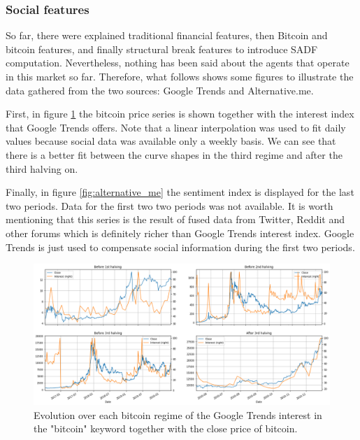 \subsubsection{Social features}
\label{sec:methods_features_social}

So far, there were explained traditional financial features, then Bitcoin and
bitcoin features, and finally structural break features to introduce SADF
computation. Nevertheless, nothing has been said about the agents that operate
in this market so far. Therefore, what follows shows some figures to illustrate
the data gathered from the two sources: Google Trends and
Alternative.me.

First, in figure \ref{fig:google_trends} the bitcoin price series is shown
together with the interest index that Google Trends offers. Note that a linear
interpolation was used to fit daily values because social data was available
only a weekly basis. We can see that there is a better fit between the curve
shapes in the third regime and after the third halving on.

Finally, in figure \ref{fig:alternative_me} the sentiment index is displayed
for the last two periods. Data for the first two two periods was not available.
It is worth mentioning that this series is the result of fused data from
Twitter, Reddit and other forums which is definitely richer than Google Trends
interest index. Google Trends is just used to compensate social information
during the first two periods.

\begin{figure}[H]
    \centering
    \includegraphics[width=\textwidth]{methods/images/gtrends_price_per_halving.png}
    \caption{Evolution over each bitcoin regime of the Google Trends interest in the "bitcoin" keyword together with the close price of bitcoin.}
    \label{fig:google_trends}
\end{figure}

